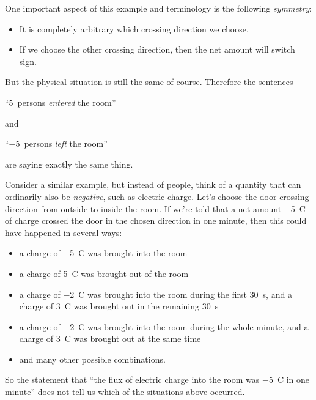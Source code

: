 \documentclass[a4paper,12pt,%
onecolumn,oneside,%
british%
]{memoir}
\newcommand{\langnohyph}[1]{\begin{hyphenrules}{nohyphenation}#1\end{hyphenrules}}
\newcommand*{\amp}{\&}
\renewcommand*{\|}[1][]{\nonscript\:#1\vert\nonscript\:\mathopen{}}
\begin{document}
One important aspect of this example and terminology is the following \emph{symmetry}:
\begin{itemize}
\item It is completely arbitrary which crossing direction we choose.
\item If we choose the other crossing direction, then the net amount will switch sign.
\end{itemize}
But the physical situation is still the same of course. Therefore the sentences
\begin{center}
  \enquote{\qty{+5}{persons} \emph{entered} the room}
\end{center}
and
\begin{center}
  \enquote{\qty{-5}{persons} \emph{left} the room}
\end{center}
are saying exactly the same thing.

\medskip

Consider a similar example, but instead of people, think of a quantity that can ordinarily also be \emph{negative}, such as electric charge. Let's choose the door-crossing direction from outside to inside the room. If we're told that a net amount \qty{-5}{C} of charge crossed the door in the chosen direction in one minute, then this could have happened in several ways:\noprelistbreak
\begin{itemize}[nosep]
\item a charge of \qty{-5}{C} was brought into the room
\item a charge of \qty{+5}{C} was brought out of the room
\item a charge of \qty{-2}{C} was brought into the room during the first \qty{30}{s}, and a charge of \qty{+3}{C} was brought out in the remaining \qty{30}{s}
\item a charge of \qty{-2}{C} was brought into the room during the whole minute, and a charge of \qty{+3}{C} was brought out at the same time
\item \textellipsis and many other possible combinations.
\end{itemize}
So the statement that \enquote{the flux of electric charge into the room was \qty{-5}{C} in one minute} does not tell us which of the situations above occurred.
\end{document}
